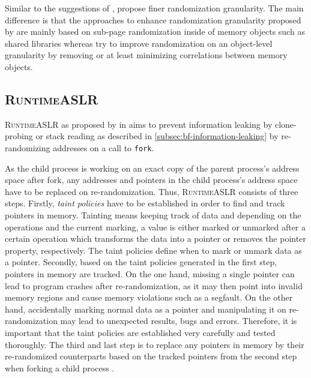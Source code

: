 \bigskip\noindent
Similar to the suggestions of \citeauthor{Shacham2004}, \citeauthor{MarcoGisbert2016} propose finer randomization granularity.
The main difference is that the approaches to enhance randomization granularity proposed by \citeauthor{Shacham2004} are mainly based on sub-page randomization inside of memory objects such as shared libraries whereas \citeauthor{MarcoGisbert2016} try to improve randomization on an object-level granularity by removing or at least minimizing correlations between memory objects.

\subsection{\textsc{RuntimeASLR}}
\label{subsec:runtimeaslr}

\textsc{RuntimeASLR} as proposed by \citeauthor{Lu2016} in \citeyear{Lu2016} aims to prevent information leaking by clone-probing or stack reading as described in \cref{subsec:bf-information-leaking} by re-randomizing addresses on a call to \texttt{fork}.

As the child process is working on an exact copy of the parent process's address space after fork, any addresses and pointers in the child process's address space have to be replaced on re-randomization.
Thus, \textsc{RuntimeASLR} consists of three steps.
Firstly, \emph{taint policies} have to be established in order to find and track pointers in memory.
Tainting means keeping track of data and depending on the operations and the current marking, a value is either marked or unmarked after a certain operation which transforms the data into a pointer or removes the pointer property, respectively.
The taint policies define when to mark or unmark data as a pointer.
Secondly, based on the taint policies generated in the first step, pointers in memory are tracked.
On the one hand, missing a single pointer can lead to program crashes after re-randomization, as it may then point into invalid memory regions and cause memory violations such as a \gls{segfault}.
On the other hand, accidentally marking normal data as a pointer and manipulating it on re-randomization may lead to unexpected results, bugs and errors.
Therefore, it is important that the taint policies are established very carefully and tested thoroughly.
The third and last step is to replace any pointers in memory by their re-randomized counterparts based on the tracked pointers from the second step when forking a child process \cite[3\psq]{Lu2016}.

